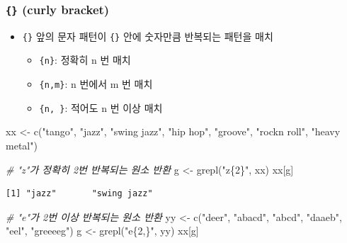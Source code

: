 \documentclass[
  11pt,
]{krantz}
\newenvironment{Shaded}{\begin{snugshade}}{\end{snugshade}}
\newcommand{\CommentTok}[1]{\textcolor[rgb]{0.37,0.37,0.37}{\textit{#1}}}
\newcommand{\FunctionTok}[1]{\textcolor[rgb]{0,0,0}{#1}}
\newcommand{\NormalTok}[1]{#1}
\newcommand{\OtherTok}[1]{\textcolor[rgb]{0.37,0.37,0.37}{#1}}
\newcommand{\StringTok}[1]{\textcolor[rgb]{0.5,0.5,0.5}{#1}}
\providecommand{\tightlist}{%
  \setlength{\itemsep}{0pt}\setlength{\parskip}{0pt}}
\begin{document}
\normalsize

\hypertarget{c-bracket}{%
\subsubsection*{\texorpdfstring{\textbf{\texttt{\{\}} (curly bracket)}}{\{\} (curly bracket)}}\label{c-bracket}}


\begin{itemize}
\tightlist
\item
  \texttt{\{\}} 앞의 문자 패턴이 \texttt{\{\}} 안에 숫자만큼 반복되는 패턴을 매치

  \begin{itemize}
  \tightlist
  \item
    \texttt{\{n\}}: 정확히 n 번 매치
  \item
    \texttt{\{n,m\}}: n 번에서 m 번 매치
  \item
    \texttt{\{n,\ \}}: 적어도 n 번 이상 매치
  \end{itemize}
\end{itemize}

\footnotesize

\begin{Shaded}
\begin{Highlighting}[]
\NormalTok{xx }\OtherTok{\textless{}{-}} \FunctionTok{c}\NormalTok{(}\StringTok{"tango"}\NormalTok{, }\StringTok{"jazz"}\NormalTok{, }\StringTok{"swing jazz"}\NormalTok{, }\StringTok{"hip hop"}\NormalTok{, }
        \StringTok{"groove"}\NormalTok{, }\StringTok{"rock\textquotesingle{}n roll"}\NormalTok{, }\StringTok{"heavy metal"}\NormalTok{)}

\CommentTok{\# "z"가 정확히 2번 반복되는 원소 반환}
\NormalTok{g }\OtherTok{\textless{}{-}} \FunctionTok{grepl}\NormalTok{(}\StringTok{"z\{2\}"}\NormalTok{, xx)}
\NormalTok{xx[g]}
\end{Highlighting}
\end{Shaded}

\begin{verbatim}
[1] "jazz"       "swing jazz"
\end{verbatim}

\begin{Shaded}
\begin{Highlighting}[]
\CommentTok{\# "e"가 2번 이상 반복되는 원소 반환}
\NormalTok{yy }\OtherTok{\textless{}{-}} \FunctionTok{c}\NormalTok{(}\StringTok{"deer"}\NormalTok{, }\StringTok{"abacd"}\NormalTok{, }\StringTok{"abcd"}\NormalTok{, }\StringTok{"daaeb"}\NormalTok{, }\StringTok{"eel"}\NormalTok{, }\StringTok{"greeeeg"}\NormalTok{)}
\NormalTok{g }\OtherTok{\textless{}{-}} \FunctionTok{grepl}\NormalTok{(}\StringTok{"e\{2,\}"}\NormalTok{, yy)}
\NormalTok{xx[g]}
\end{Highlighting}
\end{Shaded}
\end{document}
